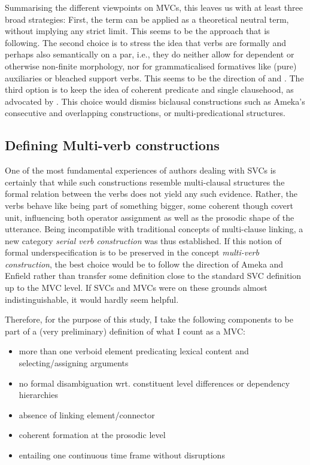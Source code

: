 Summarising the different viewpoints on MVCs, this leaves us with at least three broad strategies: First, the term can be applied as a theoretical neutral term, without implying any strict limit. This seems to be the approach that \citet{nordhoff2012} is following. The second choice is to stress the idea that verbs are formally and perhaps also semantically on a par, i.e., they do neither allow for dependent or otherwise non-finite morphology, nor for grammaticalised formatives like (pure) auxiliaries or bleached support verbs. This seems to be the direction of \citet{ameka2005multiverb, ameka2006ewe} and \citet{enfield2008verbs}. The third option is to keep the idea of coherent predicate and single clausehood, as advocated by \citet{Aikhenvald2011}. This choice would dismiss biclausal constructions such as Ameka's consecutive and overlapping constructions, or multi-predicational structures.

\subsection{Defining Multi-verb constructions}\label{sec:defining}

One of the most fundamental experiences of authors dealing with SVCs is certainly that while such constructions resemble multi-clausal structures the formal relation between the verbs does not yield any such evidence. Rather, the verbs behave like being part of something bigger, some coherent though covert unit, influencing both operator assignment as well as the prosodic shape of the utterance. Being incompatible with traditional concepts of multi-clause linking, a new category \textit{serial verb construction} was thus established. If this notion of formal underspecification is to be preserved in the concept \textit{multi-verb construction}, the best choice would be to follow the direction of Ameka and Enfield rather than transfer some definition close to the standard SVC definition up to the MVC level. If SVCs and MVCs were on these grounds almost indistinguishable, it would hardly seem helpful.

Therefore, for the purpose of this study, I take the following components to be part of a (very preliminary) definition of what I count as a MVC:

\begin{itemize}
\item more than one verboid element predicating lexical content and selecting/assigning arguments
\item no formal disambiguation wrt. constituent level differences or dependency hierarchies
\item absence of linking element/connector
\item coherent formation at the prosodic level
\item entailing one continuous time frame without disruptions
\end{itemize} 


